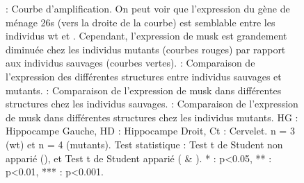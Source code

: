 \begin{figure}[h]
{				 : Courbe d'amplification. On peut voir que l'expression du gène de ménage \acrshort{26s} (vers la droite de la courbe) est semblable entre les individus \gls{wt} et \mcrd. Cependant, l'expression de \gls{musk} est grandement diminuée chez les individus mutants (courbes rouges) par rapport aux individus sauvages (courbes vertes).
				 : Comparaison de l'expression des différentes structures entre individus sauvages et mutants.
				 : Comparaison de l'expression de \gls{musk} dans différentes structures chez les individus sauvages.
				 : Comparaison de l'expression de \gls{musk} dans différentes structures chez les individus mutants.
				HG : Hippocampe Gauche, HD : Hippocampe Droit, Ct : Cervelet. n = 3 (\gls{wt}) et n = 4 (mutants). Test statistique : Test t de Student non apparié (), et Test t de Student apparié ( \& ). * : p<0.05, ** : p<0.01, *** : p<0.001. 
				}
		\label{fig:ExpressionMuSK}
	\end{figure}
